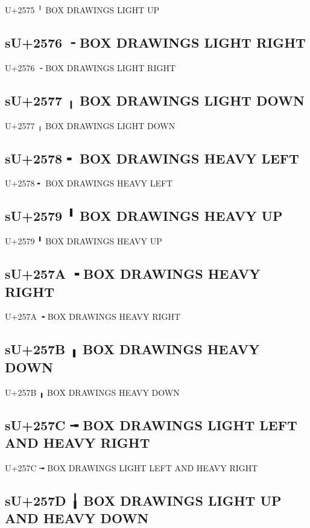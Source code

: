 U+2575 ╵ BOX DRAWINGS LIGHT UP

\subsection{sU+2576 ╶ BOX DRAWINGS LIGHT RIGHT}

U+2576 ╶ BOX DRAWINGS LIGHT RIGHT

\subsection{sU+2577 ╷ BOX DRAWINGS LIGHT DOWN}

U+2577 ╷ BOX DRAWINGS LIGHT DOWN

\subsection{sU+2578 ╸ BOX DRAWINGS HEAVY LEFT}

U+2578 ╸ BOX DRAWINGS HEAVY LEFT

\subsection{sU+2579 ╹ BOX DRAWINGS HEAVY UP}

U+2579 ╹ BOX DRAWINGS HEAVY UP

\subsection{sU+257A ╺ BOX DRAWINGS HEAVY RIGHT}

U+257A ╺ BOX DRAWINGS HEAVY RIGHT

\subsection{sU+257B ╻ BOX DRAWINGS HEAVY DOWN}

U+257B ╻ BOX DRAWINGS HEAVY DOWN

\subsection{sU+257C ╼ BOX DRAWINGS LIGHT LEFT AND HEAVY RIGHT}

U+257C ╼ BOX DRAWINGS LIGHT LEFT AND HEAVY RIGHT

\subsection{sU+257D ╽ BOX DRAWINGS LIGHT UP AND HEAVY DOWN}

